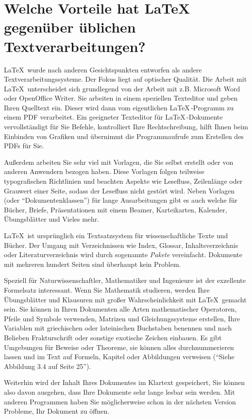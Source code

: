 \documentclass[a4paper,10pt]{scrartcl}
\begin{document}
\section*{Welche Vorteile hat \LaTeX \, gegenüber üblichen Textverarbeitungen?}
\LaTeX \, wurde nach anderen Gesichtspunkten entworfen als andere Textverarbeitungssysteme. Der Fokus liegt auf optischer Qualität. Die Arbeit mit \LaTeX \,  un\-terscheidet sich grundlegend von der Arbeit mit z.B. Microsoft Word \textregistered oder OpenOffice Writer. Sie arbeiten in einem speziellen Texteditor und geben Ihren Quelltext ein. Dieser wird dann vom eigentlichen \LaTeX \,-Programm zu einem PDF verarbeitet. Ein geeigneter Texteditor für \LaTeX \,-Dokumente vervollständigt für Sie Befehle, kontrolliert Ihre Rechtschreibung, hilft Ihnen beim Einbinden von Grafiken und übernimmt die Programmaufrufe zum Erstellen des PDFs für Sie.

Außerdem arbeiten Sie sehr viel mit Vorlagen, die Sie selbst erstellt oder von anderen Anwendern bezogen haben. Diese Vorlagen folgen teilweise typografischen Richtlinien und beachten Aspekte wie Lesefluss, Zeilenlänge oder Grauwert einer Seite, sodass der Lesefluss nicht gestört wird. Neben Vorlagen (oder "`Dokumentenklassen"') für lange Ausarbeitungen gibt es auch welche für Bücher, Briefe, Präsentationen mit einem Beamer, Karteikarten, Kalender, Übungsblätter und Vieles mehr.

\LaTeX \, ist ursprünglich ein Textsatzsystem für wissenschaftliche Texte und Bücher. Der Umgang mit Verzeichnissen wie Index, Glossar, Inhaltsverzeichnis oder Literaturverzeichnis wird durch sogenannte \emph{Pakete} vereinfacht. Dokumente mit mehreren hundert Seiten sind überhaupt kein Problem.

Speziell für Naturwissenschaftler, Mathematiker und Ingenieure ist der exzellente Formelsatz interessant. Wenn Sie Mathematik studieren, werden Ihre Übungsblätter und Klausuren mit großer Wahrscheinlichkeit mit \LaTeX \, gemacht sein. Sie können in Ihren Dokumenten alle Arten mathematischer Operatoren, Pfeile und Symbole verwenden, Matrizen und Gleichungssysteme erstellen, Ihre Variablen mit griechischen oder lateinischen Buchstaben benennen und nach Belieben Frakturschrift oder sonstige exotische Zeichen einbauen. Es gibt Umgebungen für Beweise oder Theoreme, sie können alles durchnummerieren lassen und im Text auf Formeln, Kapitel oder Abbildungen verweisen ("`Siehe Abbildung 3.4 auf Seite 25"').

Weiterhin wird der Inhalt Ihres Dokumentes im Klartext gespeichert, Sie können also davon ausgehen, dass Ihre Dokumente sehr lange lesbar sein werden. Mit anderen Programmen haben Sie möglicherweise schon in der nächsten Version Probleme, Ihr Dokument zu öffnen.
\end{document}
